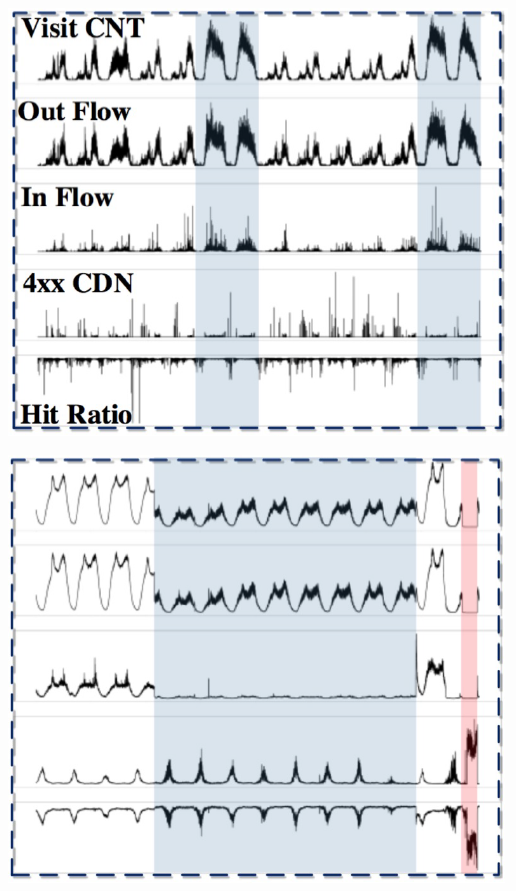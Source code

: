 \documentclass[a0,portrait]{a0poster}
\begin{document}
\begin{multicols}{2}
\begin{center}
	\begin{minipage}[c]{0.18\linewidth}	
		\centering
		\captionsetup[subfigure]{labelformat=parens} %
		\includegraphics[width=\linewidth]{CDN_KPI/cdn_kpi_a}
		\label{fig:cdn_kpi_a}
	\end{minipage}
	\begin{minipage}[c]{0.18\linewidth}
		\centering
		\includegraphics[width=\linewidth]{CDN_KPI/cdn_kpi_b}

\end{minipage}
\end{center}
\end{multicols}
\end{document}
